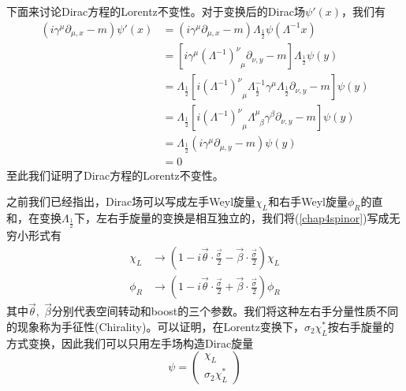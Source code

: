 下面来讨论Dirac方程的Lorentz不变性。对于变换后的Dirac场$\psi'(x)$，我们有
\begin{equation}
\begin{aligned}
    (i\gamma^{\mu}\partial_{\mu,x}-m)\psi'(x)&=(i\gamma^{\mu}\partial_{\mu,x}-m)\Lambda_{\frac{1}{2}}\psi(\Lambda^{-1}x)\\
    &=\left[i\gamma^{\mu}(\Lambda^{-1})^{\nu}_{\;\;\mu}\partial_{\nu,y}-m\right]\Lambda_{\frac{1}{2}}\psi(y)\\
    &=\Lambda_{\frac{1}{2}}\left[i(\Lambda^{-1})^{\nu}_{\;\;\mu}\Lambda_{\frac{1}{2}}^{-1}\gamma^{\mu}\Lambda_{\frac{1}{2}}\partial_{\nu,y}-m\right]\psi(y)\\
    &=\Lambda_{\frac{1}{2}}\left[i(\Lambda^{-1})^{\nu}_{\;\;\mu}\Lambda^{\mu}_{\;\;\beta}\gamma^{\beta}\partial_{\nu,y}-m\right]\psi(y)\\
    &=\Lambda_{\frac{1}{2}} (i\gamma^{\mu}\partial_{\mu,y}-m)\psi(y)\\
    &=0
    \end{aligned}
\end{equation}
至此我们证明了Dirac方程的Lorentz不变性。

之前我们已经指出，Dirac场可以写成左手Weyl旋量$\chi_{L}$和右手Weyl旋量$\phi_{R}$的直和，在变换$\Lambda_{\frac{1}{2}}$下，左右手旋量的变换是相互独立的，我们将(\ref{chap4spinor})写成无穷小形式有
\begin{equation}
    \begin{aligned}
            \chi_{L}&\longrightarrow \left(1-i\vec{\theta}\cdot \frac{\vec{\sigma}}{2}-\vec{\beta}\cdot \frac{\vec{\sigma}}{2}\right)\chi_{L}\\
        \phi_{R}&\longrightarrow \left(1-i\vec{\theta}\cdot \frac{\vec{\sigma}}{2}+\vec{\beta}\cdot \frac{\vec{\sigma}}{2}\right)\phi_{R}
    \end{aligned}
\end{equation}
其中$\vec{\theta},\;\vec{\beta}$分别代表空间转动和boost的三个参数。我们将这种左右手分量性质不同的现象称为手征性(Chirality)。可以证明，在Lorentz变换下，$\sigma_{2}\chi_{L}^{*}$按右手旋量的方式变换，因此我们可以只用左手场构造Dirac旋量
\begin{equation}
    \psi=\left(\begin{array}{cc}
         \chi_{L}  \\
         \sigma_{2}\chi_{L}^{*} 
    \end{array}\right)
\end{equation}

